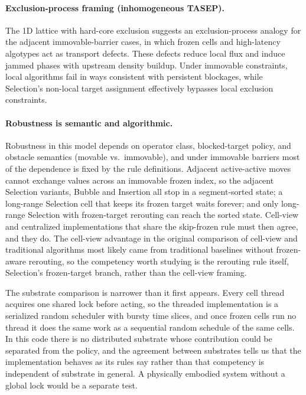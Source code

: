 \documentclass[11pt]{article}
\begin{document}
\paragraph{Exclusion-process framing (inhomogeneous TASEP).}
The 1D lattice with hard-core exclusion suggests an exclusion-process analogy for the adjacent
immovable-barrier cases, in which frozen cells and high-latency algotypes act as transport defects.
These defects reduce local flux and induce jammed phases with upstream density buildup. Under
immovable constraints, local algorithms fail in ways consistent with persistent blockages, while
Selection’s non-local target assignment effectively bypasses local exclusion constraints.

\paragraph{Robustness is semantic and algorithmic.}
Robustness in this model depends on operator class, blocked-target policy, and obstacle semantics
(movable vs.\ immovable), and under immovable barriers most of the dependence is fixed by the rule
definitions. Adjacent active-active moves cannot exchange values across an immovable frozen index,
so the adjacent Selection variants, Bubble and Insertion all stop in a segment-sorted state; a
long-range Selection cell that keeps its frozen target waits forever; and only long-range Selection
with frozen-target rerouting can reach the sorted state. Cell-view and centralized implementations
that share the skip-frozen rule must then agree, and they do. The cell-view advantage in the
original comparison of cell-view and traditional algorithms most likely came from traditional
baselines without frozen-aware rerouting, so the competency worth studying is the rerouting rule
itself, Selection's frozen-target branch, rather than the cell-view framing.

The substrate comparison is narrower than it first appears. Every cell thread acquires one shared
lock before acting, so the threaded implementation is a serialized random scheduler with bursty
time slices, and once frozen cells run no thread it does the same work as a sequential random
schedule of the same cells. In this code there is no distributed substrate whose contribution could
be separated from the policy, and the agreement between substrates tells us that the
implementation behaves as its rules say rather than that competency is independent of substrate in
general. A physically embodied system without a global lock would be a separate test.
\end{document}
